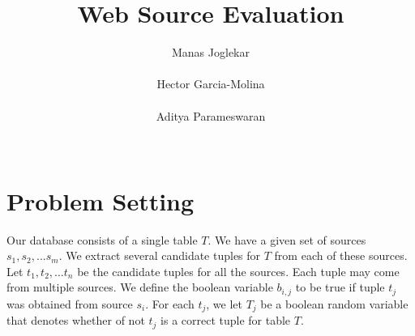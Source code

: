 \documentclass{sig-alternate}
\begin{document}
\title{Web Source Evaluation}
\author{
\alignauthor
Manas Joglekar\\
       \\
\alignauthor
Hector Garcia-Molina\\
       \\
\alignauthor 
Aditya Parameswaran\\
       \\
}
\maketitle

\begin{abstract}
\end{abstract}

\section{Problem Setting}
Our database consists of a single table $T$. We have a given set of sources $s_1, s_2, ... s_m$. We extract several candidate tuples for $T$ from each of these sources. Let $t_1, t_2, ... t_n$ be the candidate tuples for all the sources. Each tuple may come from multiple sources. We define the boolean variable $b_{i,j}$ to be true if tuple $t_j$ was obtained from source $s_i$. For each $t_j$, we let $T_j$ be a boolean random variable that denotes whether of not $t_j$ is a correct tuple for table $T$. 
\end{document}
